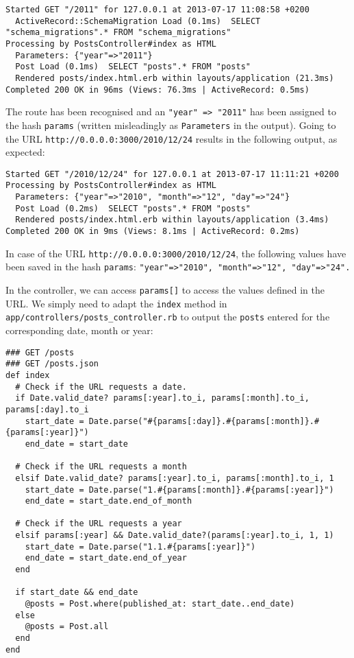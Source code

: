 \documentclass[a4paper]{book}
\begin{document}
\begin{shaded}\begin{verbatim}
Started GET "/2011" for 127.0.0.1 at 2013-07-17 11:08:58 +0200
  ActiveRecord::SchemaMigration Load (0.1ms)  SELECT "schema_migrations".* FROM "schema_migrations"
Processing by PostsController#index as HTML
  Parameters: {"year"=>"2011"}
  Post Load (0.1ms)  SELECT "posts".* FROM "posts"
  Rendered posts/index.html.erb within layouts/application (21.3ms)
Completed 200 OK in 96ms (Views: 76.3ms | ActiveRecord: 0.5ms)
\end{verbatim}\end{shaded}

The route has been recognised and an \texttt{"year" =\textgreater{}       "2011"} has been assigned to the hash \texttt{params} (written misleadingly as \texttt{Parameters} in the output). Going to the URL \texttt{http://0.0.0.0:3000/2010/12/24} results in the following output, as expected:

\begin{shaded}\begin{verbatim}
Started GET "/2010/12/24" for 127.0.0.1 at 2013-07-17 11:11:21 +0200
Processing by PostsController#index as HTML
  Parameters: {"year"=>"2010", "month"=>"12", "day"=>"24"}
  Post Load (0.2ms)  SELECT "posts".* FROM "posts"
  Rendered posts/index.html.erb within layouts/application (3.4ms)
Completed 200 OK in 9ms (Views: 8.1ms | ActiveRecord: 0.2ms)
\end{verbatim}\end{shaded}

In case of the URL \texttt{http://0.0.0.0:3000/2010/12/24}, the following values have been saved in the hash \texttt{params}: \texttt{"year"=\textgreater{}"2010", "month"=\textgreater{}"12",       "day"=\textgreater{}"24".}

In the controller, we can access \texttt{params{[}{]}} to access the values defined in the URL. We simply need to adapt the \texttt{index} method in \texttt{app/controllers/posts\_controller.rb} to output the \texttt{posts} entered for the corresponding date, month or year:

\begin{shaded}\begin{verbatim}
### GET /posts
### GET /posts.json
def index
  # Check if the URL requests a date.
  if Date.valid_date? params[:year].to_i, params[:month].to_i, params[:day].to_i
    start_date = Date.parse("#{params[:day]}.#{params[:month]}.#{params[:year]}")
    end_date = start_date

  # Check if the URL requests a month
  elsif Date.valid_date? params[:year].to_i, params[:month].to_i, 1
    start_date = Date.parse("1.#{params[:month]}.#{params[:year]}")
    end_date = start_date.end_of_month

  # Check if the URL requests a year
  elsif params[:year] && Date.valid_date?(params[:year].to_i, 1, 1)
    start_date = Date.parse("1.1.#{params[:year]}")
    end_date = start_date.end_of_year
  end

  if start_date && end_date
    @posts = Post.where(published_at: start_date..end_date)
  else
    @posts = Post.all
  end
end
\end{verbatim}\end{shaded}
\end{document}
